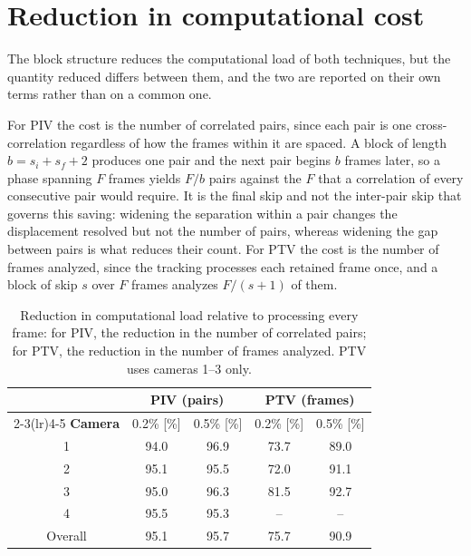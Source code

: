 \documentclass[%
  aip,
  pof,
  reprint,
  floatfix
]{revtex4-2}
\begin{document}
\section{Reduction in computational cost}
\label{sup:cost}

The block structure reduces the computational load of both techniques, but the quantity reduced differs between them, and the two are reported on their own terms rather than on a common one.

For PIV the cost is the number of correlated pairs, since each pair is one cross-correlation regardless of how the frames within it are spaced. A block of length $b = s_i + s_f + 2$ produces one pair and the next pair begins $b$ frames later, so a phase spanning $F$ frames yields $F/b$ pairs against the $F$ that a correlation of every consecutive pair would require. It is the final skip and not the inter-pair skip that governs this saving: widening the separation within a pair changes the displacement resolved but not the number of pairs, whereas widening the gap between pairs is what reduces their count. For PTV the cost is the number of frames analyzed, since the tracking processes each retained frame once, and a block of skip $s$ over $F$ frames analyzes $F/(s+1)$ of them.

\begin{table}[htb]
\centering
\caption{Reduction in computational load relative to processing every frame: for PIV, the reduction in the number of correlated pairs; for PTV, the reduction in the number of frames analyzed. PTV uses cameras 1--3 only.}
\label{tab:sup_cost}
\begin{tabular}{c c c c c}
\toprule
 & \multicolumn{2}{c}{\textbf{PIV (pairs)}} & \multicolumn{2}{c}{\textbf{PTV (frames)}} \\
\cmidrule(lr){2-3}\cmidrule(lr){4-5}
\textbf{Camera} & 0.2\% [\%] & 0.5\% [\%] & 0.2\% [\%] & 0.5\% [\%] \\
\midrule
1 & 94.0 & 96.9 & 73.7 & 89.0 \\
2 & 95.1 & 95.5 & 72.0 & 91.1 \\
3 & 95.0 & 96.3 & 81.5 & 92.7 \\
4 & 95.5 & 95.3 & --   & --   \\
\midrule
Overall & 95.1 & 95.7 & 75.7 & 90.9 \\
\bottomrule
\end{tabular}
\end{table}
\end{document}
